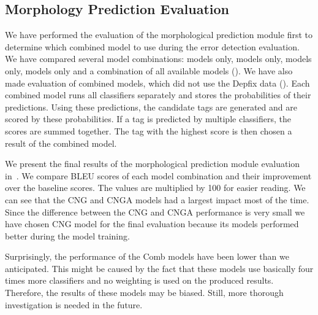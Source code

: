 \subsection{Morphology Prediction Evaluation}

We have performed the evaluation of the morphological prediction module first to determine
which combined model to use during the error detection evaluation. We have compared
several model combinations:  models only,  models only,  models only, 
 models only and a combination of all available models (). We have also
made evaluation of combined models, which did not use the Depfix data ().
Each combined model runs all classifiers separately and stores the probabilities of their
predictions. Using these predictions, the candidate tags are generated and are scored by 
these probabilities. If a tag is predicted by multiple classifiers, the scores are summed together.
The tag with the highest score is then chosen a result of the combined model.

We present the final results of the morphological prediction module evaluation in~.
We compare BLEU scores of each model combination and their improvement over the baseline scores.
The values are multiplied by 100 for easier reading. We can see that the CNG
and CNGA models had a largest impact most of the time. Since the difference between the CNG and CNGA
performance is very small we have chosen CNG model for the final evaluation because its models
performed better during the model training.

Surprisingly, the performance of the Comb models have been lower than we anticipated. This might be caused
by the fact that these models use basically four times more classifiers and no weighting is used
on the produced results. Therefore, the results of these models may be biased. Still, more thorough
investigation is needed in the future.

